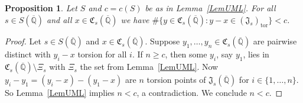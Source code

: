 \documentclass[10pt,a4paper]{amsart}
\newtheorem{proposition}{Proposition}
\newcommand{\IQbar}{{\overline{\QQ}}}
\def\QQ{\mathbb{Q}}
\newcommand{\ssm}{\setminus}
\begin{document}
\begin{proposition}\label{PropUML}
  Let $S$ and $c=c(S)$ be as in Lemma~\ref{LemUML}. For
  all $s\in S(\IQbar)$ and all $x \in \mathfrak{C}_s(\IQbar)$ we
  have  $\#\{y \in \mathfrak{C}_s(\IQbar) : y-x \in (\mathfrak{J}_s)_{\mathrm{tor}} \} < c$.
\end{proposition}

\begin{proof}
  Let $s\in S(\IQbar)$ and $x\in \mathfrak{C}_s(\IQbar)$.
  Suppose $y_1,\ldots,y_n\in\mathfrak{C}_s(\IQbar)$ are pairwise
  distinct with $y_i-x$ torsion for all $i$.
  If $n\ge c$, then some $y_i$, say $y_1$, lies in
  $\mathfrak{C}_s(\IQbar)\ssm \Xi_s$ with $\Xi_s$ the set from
  Lemma~\ref{LemUML}.
  Now $y_i-y_1 = (y_i-x)-(y_1-x)$ are $n$  torsion points
  of $\mathfrak{J}_s(\IQbar)$ for $i\in\{1,\ldots,n\}$. So
  Lemma~\ref{LemUML} implies $n<c$, a contradiction. We conclude $n<c$. 
\end{proof}
\end{document}
